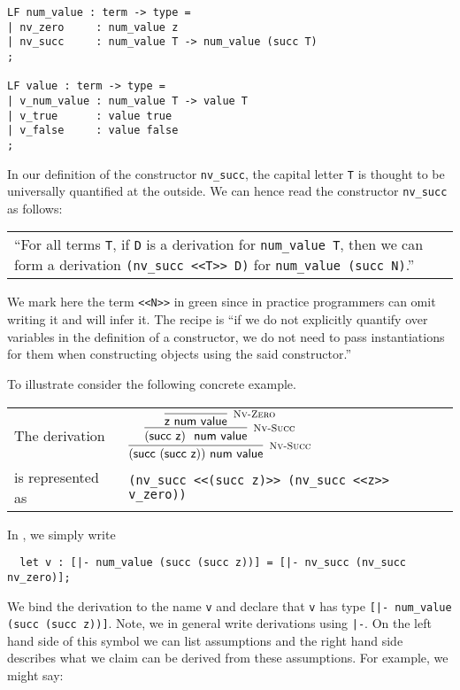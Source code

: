 \begin{lstlisting}
LF num_value : term -> type =
| nv_zero     : num_value z
| nv_succ     : num_value T -> num_value (succ T)
;

LF value : term -> type =
| v_num_value : num_value T -> value T
| v_true      : value true
| v_false     : value false
;
\end{lstlisting}

In our definition  of  the constructor \lstinline!nv_succ!, the  capital  letter
\lstinline!T! is thought  to be  universally quantified  at the outside.  We can
hence read the constructor \lstinline!nv_succ! as follows:

\begin{center}
\begin{tabular}{p{12cm}}
``For  all  terms   \lstinline$T$,   if   \lstinline!D!  is  a  derivation   for
\lstinline!num_value T!,      then      we     can     form     a     derivation
\lstinline!(nv_succ <<T>> D)! for \lstinline!num_value (succ N)!.''
\end{tabular}
\end{center}


We mark here  the term \lstinline!<<N>>! in green  since in practice programmers
can omit  writing it  and \beluga  will infer it.  The recipe is  ``if we do not
explicitly quantify over variables in the definition of a constructor, we do not
need  to pass instantiations  for them when constructing objects  using the said
constructor.''

To illustrate consider the following concrete example.\\[1em]

\begin{tabular}{l@{\qquad}l}
The derivation &
$
\infer[\NVSucc]
  { (\tmsucc (\tmsucc \tmzero)) \NumValue }
  { \infer[\NVSucc]
      { (\tmsucc \tmzero)~\NumValue }
      { \infer[\NVZero]
          {\tmzero \NumValue}
          {}
      }
  }
$\\[1em]
is represented as &
\lstinline!(nv_succ <<(succ z)>> (nv_succ <<z>> v_zero))!\\[1em]
\end{tabular}

In \beluga, we simply write
\begin{lstlisting}
  let v : [|- num_value (succ (succ z))] = [|- nv_succ (nv_succ nv_zero)];
\end{lstlisting}

We bind the derivation to the name \lstinline!v!  and declare that \lstinline!v!
has type \lstinline![|- num_value (succ (succ z))]!.  Note,  we in general write
derivations using \lstinline!|-!.  On the left hand side  of this symbol  we can
list assumptions and the right hand side describes  what we claim can be derived
from these assumptions.  For example, we might say:

